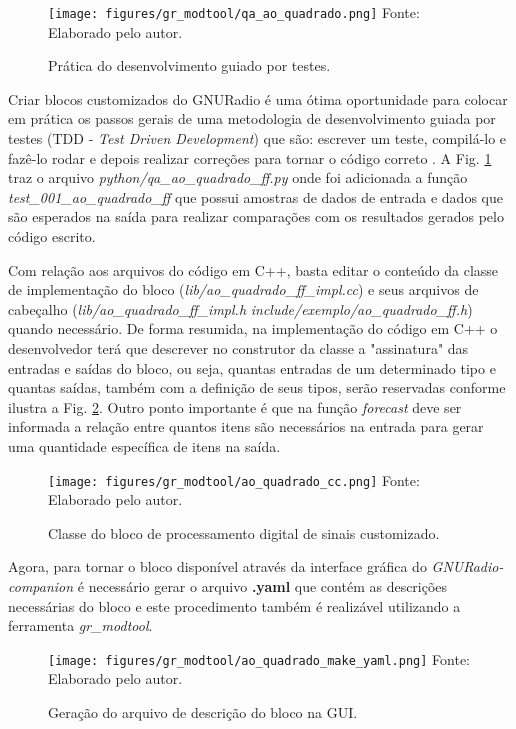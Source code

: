 \documentclass[
  12pt,				%
  openright,			%
  twoside,			%
  a4paper,			%
  english,			%
  french,				%
  spanish,			%
  brazil,				%
  ]{abntex2}
\begin{document}
\begin{figure}[!htb]
  \centering
  \caption{Prática do desenvolvimento guiado por testes.}
  \texttt{[image: figures/gr\_modtool/qa\_ao\_quadrado.png]}
  Fonte: Elaborado pelo autor.
  \label{fig:qa_ao_quadrado}
\end{figure}

Criar blocos customizados do GNURadio é uma ótima oportunidade para colocar em prática os passos gerais de uma metodologia de desenvolvimento guiada por testes (TDD -
\textit{Test Driven Development}) que são: escrever um teste, compilá-lo e fazê-lo rodar e depois realizar correções para tornar o código correto \cite{KentBeck:TDD-2002}. A Fig.
\ref{fig:qa_ao_quadrado} traz o arquivo \textit{python/qa\_ao\_quadrado\_ff.py} onde foi adicionada a função \textit{test\_001\_ao\_quadrado\_ff} que possui amostras de dados de
entrada e dados que são esperados na saída para realizar comparações com os resultados gerados pelo código escrito.

Com relação aos arquivos do código em C++, basta editar o conteúdo da classe de implementação do bloco (\textit{lib/ao\_quadrado\_ff\_impl.cc}) e seus arquivos de cabeçalho
(\textit{lib/ao\_quadrado\_ff\_impl.h} \textit{include/exemplo/ao\_quadrado\_ff.h}) quando necessário. De forma resumida, na implementação do código em C++ o desenvolvedor terá que descrever
no construtor da classe a "assinatura" das entradas e saídas do bloco, ou seja, quantas entradas de um determinado tipo e quantas saídas, também com a definição de seus tipos, serão reservadas conforme
ilustra a Fig. \ref{fig:ao_quadrado_cc}.
Outro ponto importante é que na função \textit{forecast} deve ser informada a relação entre quantos itens são necessários na entrada para gerar uma quantidade específica de itens na saída.

\begin{figure}[!htb]
  \centering
  \caption{Classe do bloco de processamento digital de sinais customizado.}
  \texttt{[image: figures/gr\_modtool/ao\_quadrado\_cc.png]}
  Fonte: Elaborado pelo autor.
  \label{fig:ao_quadrado_cc}
\end{figure}

Agora, para tornar o bloco disponível através da interface gráfica do \textit{GNURadio-companion} é necessário gerar o arquivo \textbf{.yaml} que contém as descrições necessárias do bloco e
este procedimento também é realizável utilizando a ferramenta \textit{gr\_modtool}.

\begin{figure}[!htb]
  \centering
  \caption{Geração do arquivo de descrição do bloco na GUI.}
  \texttt{[image: figures/gr\_modtool/ao\_quadrado\_make\_yaml.png]}
  Fonte: Elaborado pelo autor.
  \label{fig:ao_quadrado_make_yaml}
\end{figure}
\end{document}
